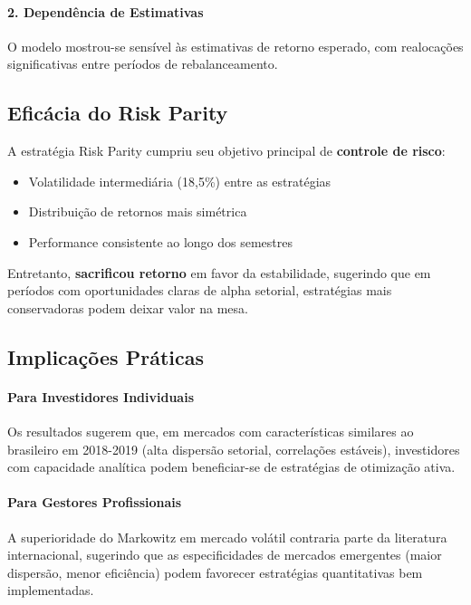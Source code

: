 \paragraph{2. Dependência de Estimativas}
O modelo mostrou-se sensível às estimativas de retorno esperado, com realocações significativas entre períodos de rebalanceamento.

\subsection{Eficácia do Risk Parity}

A estratégia Risk Parity cumpriu seu objetivo principal de \textbf{controle de risco}:

\begin{itemize}
    \item Volatilidade intermediária (18,5\%) entre as estratégias
    \item Distribuição de retornos mais simétrica
    \item Performance consistente ao longo dos semestres
\end{itemize}

Entretanto, \textbf{sacrificou retorno} em favor da estabilidade, sugerindo que em períodos com oportunidades claras de alpha setorial, estratégias mais conservadoras podem deixar valor na mesa.

\subsection{Implicações Práticas}

\paragraph{Para Investidores Individuais}
Os resultados sugerem que, em mercados com características similares ao brasileiro em 2018-2019 (alta dispersão setorial, correlações estáveis), investidores com capacidade analítica podem beneficiar-se de estratégias de otimização ativa.

\paragraph{Para Gestores Profissionais}
A superioridade do Markowitz em mercado volátil contraria parte da literatura internacional, sugerindo que as especificidades de mercados emergentes (maior dispersão, menor eficiência) podem favorecer estratégias quantitativas bem implementadas.

